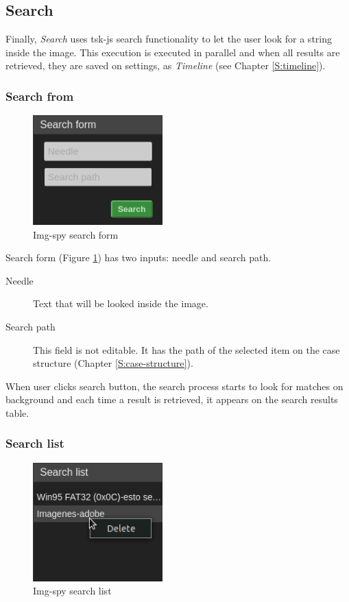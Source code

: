 \subsection{Search}

Finally, \textit{Search} uses tsk-js search functionality to let the
user look for a string inside the image. This execution is executed in parallel
and when all results are retrieved, they are saved on settings, as
\textit{Timeline} (see Chapter \ref{S:timeline}).

\clearpage

\subsubsection{Search from}

\begin{figure}
	\includegraphics[width=5cm]
	{./figures/search-form.png}
	\centering
	\caption{Img-spy search form}
	\label{F:img-spy-search-form}
\end{figure}

Search form (Figure \ref{F:img-spy-search-form}) has two inputs: needle and
search path.

\begin{description}
	\item[Needle] Text that will be looked inside the image.
	\item[Search path] This field is not editable. It has the path of the
	selected item on the case structure (Chapter \ref{S:case-structure}).
\end{description}

When user clicks search button, the search process starts to look for matches
on background and each time a result is retrieved, it appears on the search
results table.

\subsubsection{Search list}

\begin{figure}
	\includegraphics[width=5cm]
	{./figures/search-list.png}
	\centering
	\caption{Img-spy search list}
	\label{F:img-spy-search-list}
\end{figure}

